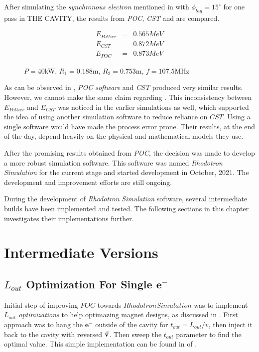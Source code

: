 \documentclass[a4paper,oneside,12pt]{report}
\numberwithin{equation}{chapter}
\begin{document}
After simulating the \textit{synchronous electron} mentioned in  with $\phi_{lag}=15^\circ$ for one pass in THE CAVITY, the results from \textit{POC}, \textit{CST} and  are compared.
\begin{figure}[H]
    \begin{eqnarray}
        E_{Pottier} &=& 0.565 MeV \nonumber\\
        E_{CST} &=& 0.872 MeV  \label{eq:poc_E_results}\\
        E_{POC} &=& 0.873 MeV \nonumber
    \end{eqnarray}
    \caption*{$P=40$kW, $R_1=0.188$m, $R_2=0.753$m, $f=107.5$MHz}
\end{figure}


As can be observed in , \textit{POC software} and \textit{CST} produced very similar results. However, we cannot make the same claim regarding .
This inconsistency between $E_{Pottier}$ and $E_{CST}$ was noticed in the earlier simulations as well, which supported the idea of using another simulation software to reduce reliance on $CST$.
Using a single software would have made the process error prone. Their results, at the end of the day, depend heavily on the physical and mathematical models they use.

After the promising results obtained from \textit{POC}, the decision was made to develop a more robust simulation software. This software was named \textit{Rhodotron Simulation} for the current stage and started development in October, 2021.
The development and improvement efforts are still ongoing. 

During the development of \textit{Rhodotron Simulation} software, several intermediate builds have been implemented and tested. The following sections in this chapter investigates their implementations further.



\newpage


\section{Intermediate Versions}

\subsection{$L_{out}$ Optimization For Single $\textbf{e}^-$}
Initial step of improving $POC$ towards $Rhodotron Simulation$ was to implement \textit{$L_{out}$ optimizations} to help optimazing magnet designs, as discussed in .
First approach was to hang the $\textbf{e}^-$ outside of the cavity for $t_{out} = L_{out}/v$, then inject it back to the cavity with reversed $\vec{\textbf{v}}$. Then sweep the $t_{out}$ parameter to find the optimal value.
This simple implementation can be found in  of .
\end{document}

